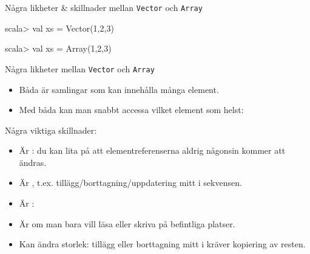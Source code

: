 \begin{Slide}{Några likheter \& skillnader mellan \texttt{Vector} och \texttt{Array}}\SlideFontSmall
\begin{multicols}{2}
\begin{REPLnonum}
scala> val xs = Vector(1,2,3)
\end{REPLnonum}

\columnbreak

\begin{REPLnonum}
scala> val xs = Array(1,2,3)
\end{REPLnonum}
\end{multicols}


Några likheter mellan \texttt{Vector} och \texttt{Array}
\begin{itemize}
\item Båda är samlingar som kan innehålla många element.

\item Med båda kan man snabbt accessa vilket element som helst: 
\end{itemize}
Några viktiga skillnader:

\vspace{-0.5em}\begin{multicols}{2}
\begin{itemize}
\item Är : du kan lita på att elementreferenserna aldrig någonsin kommer att ändras.

\item Är , t.ex. tillägg/borttagning/uppdatering mitt i sekvensen.

\end{itemize}


\columnbreak

\begin{itemize}
\item Är : 

\item Är  om man bara vill läsa eller skriva på befintliga platser.

\item Kan  ändra storlek: tillägg eller borttagning mitt i kräver  kopiering av resten.

\end{itemize}
\end{multicols}
\end{Slide}



